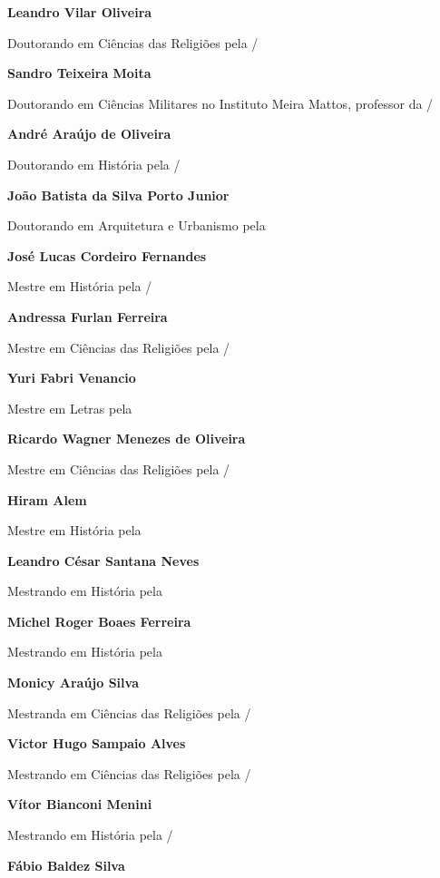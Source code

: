 \textbf{Leandro Vilar Oliveira}

Doutorando em Ciências das Religiões pela /
\medskip

\textbf{Sandro Teixeira Moita}

Doutorando em Ciências Militares no Instituto Meira Mattos, professor da
/
\medskip

\textbf{André Araújo de Oliveira}

Doutorando em História pela /
\medskip

\textbf{João Batista da Silva Porto Junior}

Doutorando em Arquitetura e Urbanismo pela 
\medskip

\textbf{José Lucas Cordeiro Fernandes}

Mestre em História pela /
\medskip

\textbf{Andressa Furlan Ferreira}

Mestre em Ciências das Religiões pela /
\medskip

\textbf{Yuri Fabri Venancio}

Mestre em Letras pela 
\medskip

\textbf{Ricardo Wagner Menezes de Oliveira}

Mestre em Ciências das Religiões pela /
\medskip

\textbf{Hiram Alem}

Mestre em História pela 
\medskip

\textbf{Leandro César Santana Neves}

Mestrando em História pela 
\medskip

\textbf{Michel Roger Boaes Ferreira}

Mestrando em História pela 
\medskip

\pagebreak
\textbf{Monicy Araújo Silva}

Mestranda em Ciências das Religiões pela /
\medskip

\textbf{Victor Hugo Sampaio Alves}

Mestrando em Ciências das Religiões pela /
\medskip

\textbf{Vítor Bianconi Menini}

Mestrando em História pela /
\medskip

\textbf{Fábio Baldez Silva}

